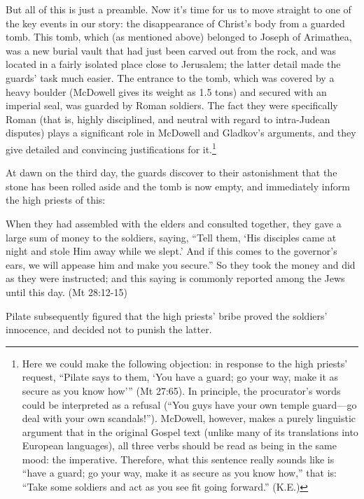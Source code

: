 But all of this is just a preamble. Now it's time for us to move straight to one of the key events in our story: the disappearance of Christ's body from a guarded tomb. This tomb, which (as mentioned above) belonged to Joseph of Arimathea, was a new burial vault that had just been carved out from the rock, and was located in a fairly isolated place close to Jerusalem; the latter detail made the guards' task much easier. The entrance to the tomb, which was covered by a heavy boulder (McDowell gives its weight as 1.5 tons) and secured with an imperial seal, was guarded by Roman soldiers. The fact they were specifically Roman (that is, highly disciplined, and neutral with regard to intra-Judean disputes) plays a significant role in McDowell and Gladkov's arguments, and they give detailed and convincing justifications for it.\footnote{Here we could make the following objection: in response to the high priests' request, ``Pilate says to them, `You have a guard; go your way, make it as secure as you know how''' (Mt 27:65). In principle, the procurator's words could be interpreted as a refusal (``You guys have your own temple guard---go deal with your own scandals!''). McDowell, however, makes a purely linguistic argument that in the original Gospel text (unlike many of its translations into European languages), all three verbs should be read as being in the same mood: the imperative. Therefore, what this sentence really sounds like is ``have a guard; go your way, make it as secure as you know how,'' that is: ``Take some soldiers and act as you see fit going forward.'' (K.E.)}

At dawn on the third day, the guards discover to their astonishment that the stone has been rolled aside and the tomb is now empty, and immediately inform the high priests of this:

\begin{smallquote}
    When they had assembled with the elders and consulted together, they gave a large sum of money to the soldiers, saying, ``Tell them, `His disciples came at night and stole Him away while we slept.' And if this comes to the governor's ears, we will appease him and make you secure.'' So they took the money and did as they were instructed; and this saying is commonly reported among the Jews until this day. (Mt 28:12-15)
\end{smallquote}
Pilate subsequently figured that the high priests' bribe proved the soldiers' innocence, and decided not to punish the latter.

